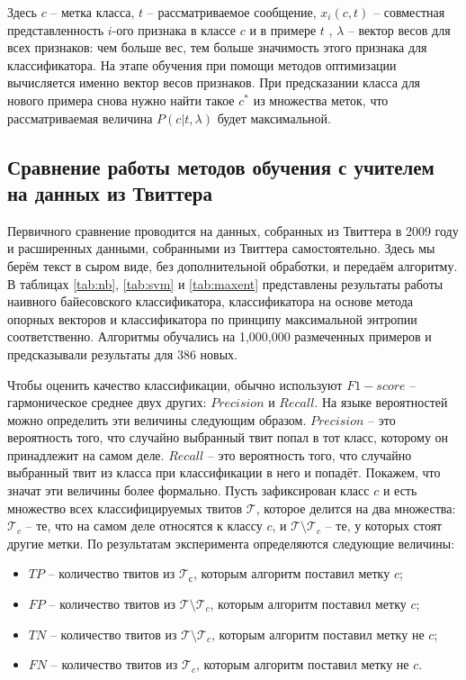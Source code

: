 Здесь $c$ -- метка класса, $t$ -- рассматриваемое сообщение, $x_i(c,t)$ -- совместная
представленность $i$-ого признака в классе $c$ и в примере $t$ , $\lambda$ -- вектор весов для всех
признаков: чем больше вес, тем больше значимость этого признака для классификатора. На этапе обучения
при помощи методов оптимизации вычисляется именно вектор весов признаков. При предсказании класса
для нового примера снова нужно найти такое $c^*$ из множества меток, что рассматриваемая величина $P(c|t,\lambda)$ будет максимальной.

\subsection{Сравнение работы методов обучения с учителем на данных из Твиттера}\label{comparemeth}

Первичного сравнение проводится на данных, собранных из Твиттера в 2009 году
\cite{go2009twitter} и расширенных данными, собранными из Твиттера самостоятельно. Здесь мы берём текст в сыром виде, без дополнительной обработки, и передаём
алгоритму. В таблицах \ref{tab:nb}, \ref{tab:svm} и \ref{tab:maxent} представлены результаты работы
наивного байесовского классификатора, классификатора на основе метода опорных векторов и
классификатора по принципу максимальной энтропии соответственно. Алгоритмы обучались на 1,000,000
размеченных примеров и предсказывали результаты для 386 новых.

Чтобы оценить качество классификации, обычно используют $F1-score$ -- гармоническое среднее двух
других: $Precision$ и $Recall$. На языке вероятностей можно определить эти величины следующим образом. $Precision$ -- это
вероятность того, что случайно выбранный твит попал в тот класс, которому он принадлежит
на самом деле. $Recall$ -- это вероятность того, что случайно выбранный твит из класса
при классификации в него и попадёт. Покажем, что значат эти величины более формально.
Пусть зафиксирован класс $c$ и есть множество всех классифицируемых твитов $\mathcal{T}$,
которое делится на два множества: $\mathcal{T}_c$ -- те, что на самом деле относятся к классу $c$,
и $\mathcal{T}\setminus\mathcal{T}_c$ -- те, у которых стоят другие метки.
По результатам эксперимента определяются следующие величины:
\begin{itemize}
  \item[ ] $TP$ -- количество твитов из $\mathcal{T}_с$, которым алгоритм поставил метку $c$;
  \item[ ] $FP$ -- количество твитов из $\mathcal{T}\setminus\mathcal{T}_c$, которым алгоритм поставил метку $c$;
  \item[ ] $TN$ -- количество твитов из $\mathcal{T}\setminus\mathcal{T}_c$, которым алгоритм поставил метку не $c$;
  \item[ ] $FN$ -- количество твитов из $\mathcal{T}_c$, которым алгоритм поставил метку не $c$.
\end{itemize}

